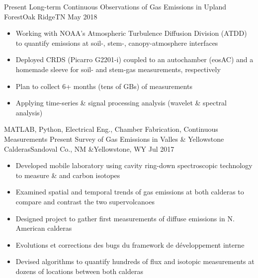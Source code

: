 %
%
%
\begin{experiences}
  \experience
    {Present}       {Long-term Continuous Observations of Gas Emissions in Upland Forest}{Oak Ridge}{TN}
    {May 2018}      {
                      \begin{itemize}
                        \item Working with NOAA’s Atmospheric Turbulence Diffusion Division (ATDD) to quantify  emissions at soil-, stem-, canopy-atmosphere interfaces                        
                        \item Deployed CRDS (Picarro G2201-i) coupled to an autochamber (eosAC) and a homemade sleeve for soil- and stem-gas measurements, respectively
                        \item Plan to collect 6+ months (tens of GBs) of measurements               
                        \item Applying time-series \& signal processing analysis (wavelet \& spectral analysis)     
                      \end{itemize}
                    }
                    {MATLAB, Python, Electrical Eng., Chamber Fabrication, Continuous Measurements}
  \emptySeparator
  \experience
    {Present}       {Survey of Gas Emissions in Valles \& Yellowstone Calderas}{Sandoval Co., NM \&}{Yellowstone, WY}
    {Jul 2017}      {
                      \begin{itemize}
                        \item Developed mobile laboratory using cavity ring-down spectroscopic technology to measure  \&  and carbon isotopes
                        \item Examined spatial and temporal trends of gas emissions at both calderas to compare and contrast the two supervolcanoes      
                        \item Designed project to gather first measurements of diffuse  emissions in N. American calderas 
                        \item Evolutions et corrections des bugs du framework de développement interne                
                        \item Devised algorithms to quantify hundreds of flux and isotopic measurements at dozens of locations between both calderas

\end{itemize}}
\end{experiences}
